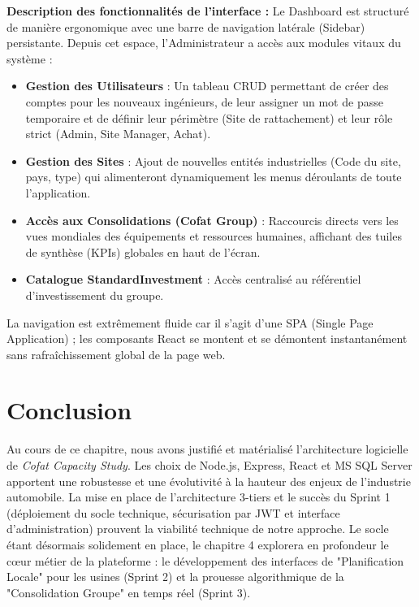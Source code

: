 \textbf{Description des fonctionnalités de l'interface :}
Le Dashboard est structuré de manière ergonomique avec une barre de navigation latérale (Sidebar) persistante. Depuis cet espace, l'Administrateur a accès aux modules vitaux du système :
\begin{itemize}
    \item \textbf{Gestion des Utilisateurs} : Un tableau CRUD permettant de créer des comptes pour les nouveaux ingénieurs, de leur assigner un mot de passe temporaire et de définir leur périmètre (Site de rattachement) et leur rôle strict (Admin, Site Manager, Achat).
    \item \textbf{Gestion des Sites} : Ajout de nouvelles entités industrielles (Code du site, pays, type) qui alimenteront dynamiquement les menus déroulants de toute l'application.
    \item \textbf{Accès aux Consolidations (Cofat Group)} : Raccourcis directs vers les vues mondiales des équipements et ressources humaines, affichant des tuiles de synthèse (KPIs) globales en haut de l'écran.
    \item \textbf{Catalogue StandardInvestment} : Accès centralisé au référentiel d'investissement du groupe.
\end{itemize}
La navigation est extrêmement fluide car il s'agit d'une SPA (Single Page Application) ; les composants React se montent et se démontent instantanément sans rafraîchissement global de la page web.

\section{Conclusion}
Au cours de ce chapitre, nous avons justifié et matérialisé l'architecture logicielle de \textit{Cofat Capacity Study}. Les choix de Node.js, Express, React et MS SQL Server apportent une robustesse et une évolutivité à la hauteur des enjeux de l'industrie automobile. La mise en place de l'architecture 3-tiers et le succès du Sprint 1 (déploiement du socle technique, sécurisation par JWT et interface d'administration) prouvent la viabilité technique de notre approche. 
Le socle étant désormais solidement en place, le chapitre 4 explorera en profondeur le cœur métier de la plateforme : le développement des interfaces de "Planification Locale" pour les usines (Sprint 2) et la prouesse algorithmique de la "Consolidation Groupe" en temps réel (Sprint 3).